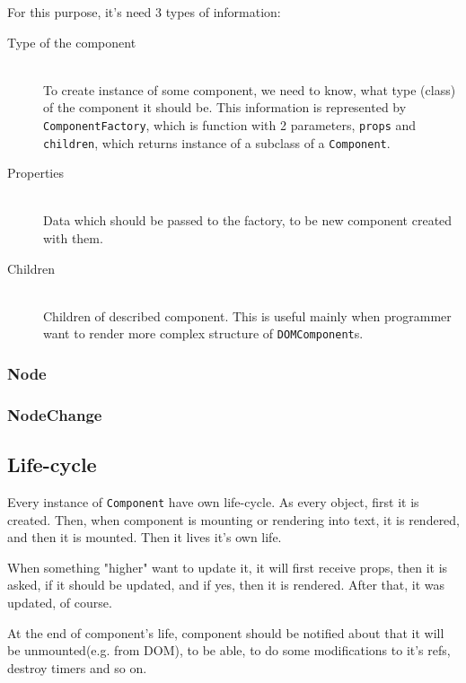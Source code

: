     For this purpose, it's need 3 types of information:
    \begin{description}
      \item[Type of the component] \hfill \\
        To create instance of some component, we need to know, what type (class) of the component it should be. 
        This information is represented by \texttt{ComponentFactory}, 
        which is function with 2 parameters, \texttt{props} and \texttt{children}, 
        which returns instance of a subclass of a \texttt{Component}.
      \item[Properties] \hfill \\
        Data which should be passed to the factory, to be new component created with them.
      \item[Children] \hfill \\
        Children of described component.  
        This is useful mainly when programmer want to render more complex structure of \texttt{DOMComponent}s.
    \end{description}
    \subsubsection{Node}\label{subsubsec:our-architecture-core-node}
    \subsubsection{NodeChange}\label{subsubsec:our-architecture-core-node-change}


  \subsection{Life-cycle}\label{subsec:our-architecture-lifecycle}

    Every instance of \texttt{Component} have own life-cycle. 
    As every object, first it is created. 
    Then, when component is mounting or rendering into text, it is rendered, and then it is mounted.
    Then it lives it's own life. 

    When something "higher" want to update it, it will first receive props, 
    then it is asked, if it should be updated, and if yes, then it is rendered.
    After that, it was updated, of course.

    At the end of component's life, 
    component should be notified about that it will be unmounted(e.g. from DOM), 
    to be able, to do some modifications to it's refs, destroy timers and so on. 

